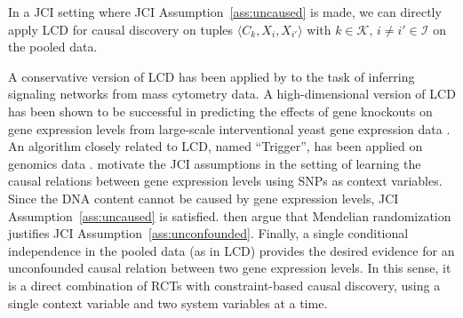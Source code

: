 \documentclass[twoside,11pt]{article}
\newcommand\C[1]{\mathcal{#1}}
\begin{document}
In a JCI setting where JCI Assumption~\ref{ass:uncaused} is made, we can directly apply LCD
for causal discovery on tuples $\langle C_k, X_i, X_{i'} \rangle$ with $k \in \C{K}$,
$i \ne i' \in \C{I}$ on the pooled data.

A conservative version of LCD has been applied by \citet{Triantafillou++2017} to the task of
inferring signaling networks from mass cytometry data. 
A high-dimensional version of LCD has been shown to be successful in predicting the
effects of gene knockouts on gene expression levels \citep{VersteegMooij_1910.02505v2}
from large-scale interventional yeast gene expression data \citep{Kemmeren2014}.
An algorithm closely related to LCD, named ``Trigger'', has been applied on genomics data \citep{Trigger2007}.
\citet{Trigger2007} motivate the JCI assumptions in the setting of learning the causal relations between gene expression levels
using SNPs as context variables. Since the DNA content cannot be caused by gene expression
levels, JCI Assumption~\ref{ass:uncaused} is satisfied. \citet{Trigger2007} then argue that Mendelian randomization 
justifies JCI Assumption~\ref{ass:unconfounded}. Finally, a single conditional independence in the pooled
data (as in LCD) provides the desired evidence for an unconfounded causal relation between
two gene expression levels. In this sense, it is a direct combination of RCTs with constraint-based
causal discovery, using a single context variable and two system variables at a time.
\end{document}
